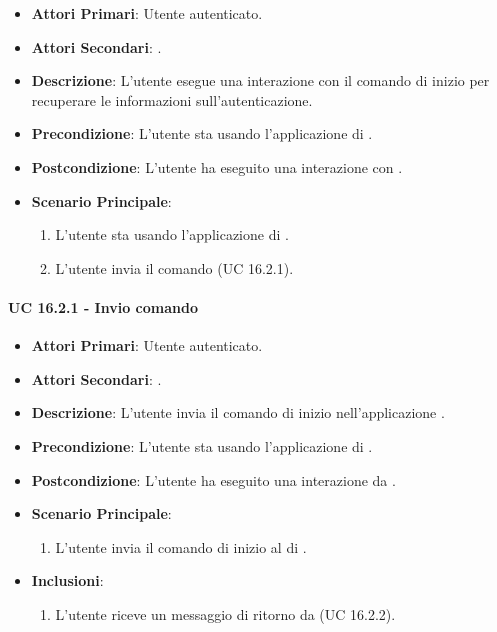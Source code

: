 	\begin{itemize}
		\item \textbf{Attori Primari}: Utente autenticato.
		\item \textbf{Attori Secondari}: .
		\item \textbf{Descrizione}: L'utente esegue una interazione con il comando di inizio per recuperare le informazioni sull'autenticazione.
		\item \textbf{Precondizione}: L'utente sta usando l'applicazione di .
		\item \textbf{Postcondizione}: L'utente ha eseguito una interazione con .
		\item \textbf{Scenario Principale}:
		\begin{enumerate}
			\item L'utente sta usando l'applicazione di . 
			\item L'utente invia il comando (UC 16.2.1).
		\end{enumerate}
	\end{itemize}

		\paragraph{UC 16.2.1 - Invio comando}
		\begin{itemize}
			\item \textbf{Attori Primari}: Utente autenticato.
			\item \textbf{Attori Secondari}: .
			\item \textbf{Descrizione}: L'utente invia il comando di inizio nell'applicazione .
			\item \textbf{Precondizione}: L'utente sta usando l'applicazione di .
			\item \textbf{Postcondizione}: L'utente ha eseguito una interazione da .
			\item \textbf{Scenario Principale}:
			\begin{enumerate}
				\item L'utente invia il comando di inizio al  di .
			\end{enumerate}
			\item \textbf{Inclusioni}:
			\begin{enumerate}
				\item L'utente riceve un messaggio di ritorno da  (UC 16.2.2).
			\end{enumerate}
		\end{itemize}

